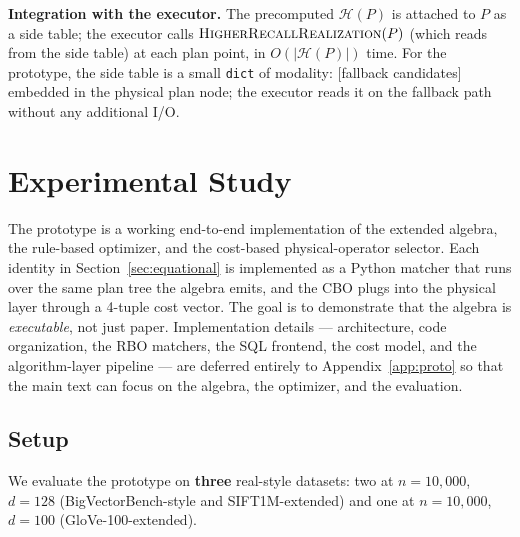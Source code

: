 \documentclass[sigconf,nonacm,review]{acmart}
\theoremstyle{plain}
\theoremstyle{definition}
\theoremstyle{remark}
\begin{document}
\noindent\textbf{Integration with the executor.}
The precomputed $\mathcal{H}(P)$ is attached to
$P$ as a side table; the executor calls
$\Call{HigherRecallRealization}{P}$
(which reads from the side table) at each plan
point, in $O(|\mathcal{H}(P)|)$ time. For the
prototype, the side table is a small
\texttt{dict} of {modality: [fallback candidates]}
embedded in the physical plan node; the executor
reads it on the fallback path without any
additional I/O.

\section{Experimental Study}\label{sec:discuss}

The prototype is a working end-to-end implementation of the
extended algebra, the rule-based optimizer, and the cost-based
physical-operator selector. Each identity in
Section~\ref{sec:equational} is implemented as a Python matcher
that runs over the same plan tree the algebra emits, and the CBO
plugs into the physical layer through a 4-tuple cost vector. The
goal is to demonstrate that the algebra is \emph{executable}, not
just paper. Implementation details --- architecture, code
organization, the RBO matchers, the SQL frontend, the cost model,
and the algorithm-layer pipeline --- are deferred entirely to
Appendix~\ref{app:proto} so that the main text can focus on
the algebra, the optimizer, and the evaluation.

\subsection{Setup}\label{sec:eval:setup}

We evaluate the prototype on \textbf{three} real-style datasets:
two at $n = 10{,}000$, $d = 128$ (BigVectorBench-style and
SIFT1M-extended) and one at $n = 10{,}000$, $d = 100$ (GloVe-100-extended).
\end{document}
